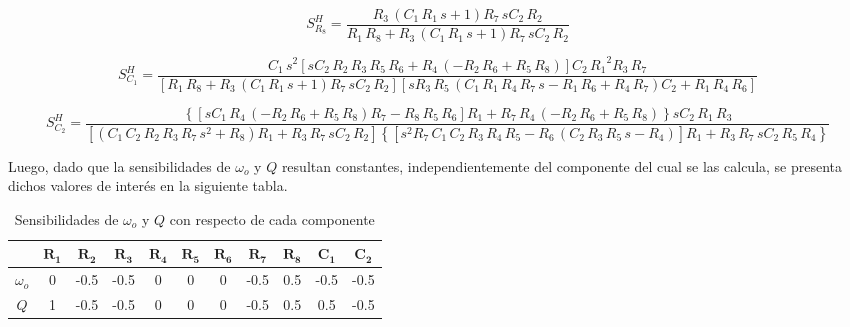 \begin{equation}
S_{R_8}^{H} = {\frac {{R_3}\, \left( {C_1}\,{R_1}\,s+1 \right) {R_7}\,s{
C_2}\,{R_2}}{{R_1}\,{R_8}+{R_3}\, \left( {C_1}\,{
R_1}\,s+1 \right) {R_7}\,s{C_2}\,{R_2}}}
\end{equation}

\begin{equation}
S_{C_1}^{H} = {\frac {{C_1}\,{s}^{2} \left[ s{C_2}\,{R_2}\,{R_3}\,{R_5}\,{R_6}+{R_4}\, \left( -{R_2}\,{R_6}+{R_5}\,{R_8}
 \right)  \right] {C_2}\,{{R_1}}^{2}{R_3}\,{R_7}}{ \left[ 
{R_1}\,{R_8}+{R_3}\, \left( {C_1}\,{R_1}\,s+1 \right) {
R_7}\,s{C_2}\,{R_2} \right]  \left[ s{R_3}\,{R_5}\,
 \left( {C_1}\,{R_1}\,{R_4}\,{R_7}\,s-{R_1}\,{R_6}+{
R_4}\,{R_7} \right) {C_2}+{R_1}\,{R_4}\,{R_6}
 \right] }}
\end{equation}

\begin{equation}
S_{C_2}^{H} = {\frac { \left\lbrace  \left[ s{C_1}\,{R_4}\, \left( -{R_2}\,{R_6}+{R_5}\,{R_8} \right) {R_7}-{R_8}\,{R_5}\,{R_6}
 \right] {R_1}+{R_7}\,{R_4}\, \left( -{R_2}\,{R_6}+{
R_5}\,{R_8} \right)  \right\rbrace s{C_2}\,{R_1}\,{R_3}}{
 \left[  \left( {C_1}\,{C_2}\,{R_2}\,{R_3}\,{R_7}\,{s}^
{2}+{R_8} \right) {R_1}+{R_3}\,{R_7}\,s{C_2}\,{R_2}
 \right]  \left\lbrace  \left[ {s}^{2}{R_7}\,{C_1}\,{C_2}\,{R_3}
\,{R_4}\,{R_5}-{R_6}\, \left( {C_2}\,{R_3}\,{R_5}\,s
-{R_4} \right)  \right] {R_1}+{R_3}\,{R_7}\,s{C_2}\,{
R_5}\,{R_4} \right\rbrace }}
\end{equation}

Luego, dado que la sensibilidades de $\omega_o$ y $Q$ resultan constantes, independientemente del componente del cual se las calcula, se presenta dichos valores de interés en la siguiente tabla.
\begin{table}[H]
\centering
\begin{tabular}{ccccccccccc}
\hline
 & $\mathbf{R_1}$ & $\mathbf{R_2}$ & $\mathbf{R_3}$ & $\mathbf{R_4}$ & $\mathbf{R_5}$ & $\mathbf{R_6}$ & $\mathbf{R_7}$ & $\mathbf{R_8}$ & $\mathbf{C_1}$ & $\mathbf{C_2}$ \\
\hline
$\omega_o$ & 0 & -0.5 & -0.5 & 0 & 0 & 0 & -0.5 & 0.5 & -0.5 & -0.5 \\
$Q$ & 1 & -0.5 & -0.5 & 0 & 0 & 0 & -0.5 & 0.5 & 0.5 & -0.5	\\
\hline
\end{tabular}
\caption{Sensibilidades de $\omega_o$ y $Q$ con respecto de cada componente}
\end{table}

